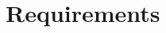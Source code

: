 \documentclass{scrartcl}
\begin{document}


\section{Requirements}\label{requirements}
\end{document}

